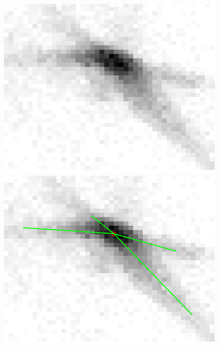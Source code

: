 	\begin{figure}[htps]
	\centering
	\begin{minipage}[c]{0.4\textwidth}
	\includegraphics[width=\textwidth]{figures/tail07.pdf}
	\end{minipage}
	\begin{minipage}[c]{0.4\textwidth}
	\includegraphics[width=\textwidth]{figures/tail08.pdf}
	\end{minipage}\\
	\begin{minipage}[c]{0.4\textwidth}

\end{minipage}
\end{figure}
